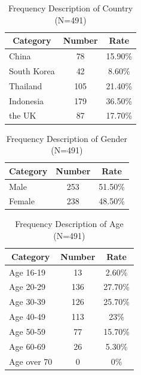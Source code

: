 \begin{table}[h]
  \caption[Frequency Description of Country]{Frequency Description of Country (N=491)}
  \label{table28a}
  \centering
  \begin{tabular}{l|cc}
 \hline
\multicolumn{1}{c|}{Category}&Number&Rate\\
 \hline
China&78&15.90\%\\
South Korea&42&8.60\%\\
Thailand&105&21.40\%\\
Indonesia&179&36.50\%\\
the UK&87&17.70\%\\
 \hline
  \end{tabular}
\end{table}

\begin{table}[h]
  \caption[Frequency Description of Gender]{Frequency Description of Gender (N=491)}
  \label{table28b}
  \centering
  \begin{tabular}{l|cc}
 \hline
\multicolumn{1}{c|}{Category}&Number&Rate\\
 \hline
Male   & 253 & 51.50\% \\
Female & 238 & 48.50\% \\
 \hline
  \end{tabular}
\end{table}

\begin{table}[h]
  \caption[Frequency Description of Age]{Frequency Description of Age (N=491)}
  \label{table28c}
  \centering
  \begin{tabular}{l|cc}
 \hline
\multicolumn{1}{c|}{Category}&Number&Rate\\
 \hline
Age 16-19   & 13  & 2.60\%  \\
Age 20-29   & 136 & 27.70\% \\
Age 30-39   & 126 & 25.70\% \\
Age 40-49   & 113 & 23\%    \\
Age 50-59   & 77  & 15.70\% \\
Age 60-69   & 26  & 5.30\%  \\
Age over 70 & 0   & 0\% \\
 \hline
  \end{tabular}
\end{table}

